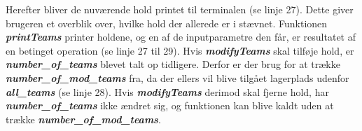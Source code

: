 Herefter bliver de nuværende hold printet til terminalen (se linje 27). Dette giver brugeren et overblik over, hvilke hold der allerede er i stævnet. Funktionen \textbf{\textit{printTeams}} printer holdene, og en af de inputparametre den får, er resultatet af en betinget operation (se linje 27 til 29). Hvis \textbf{\textit{modifyTeams}} skal tilføje hold, er \textbf{\textit{number\_of\_teams}} blevet talt op tidligere. Derfor er der brug for at trække \textbf{\textit{number\_of\_mod\_teams}} fra, da der ellers vil blive tilgået lagerplads udenfor \textbf{\textit{all\_teams}} (se linje 28). Hvis \textbf{\textit{modifyTeams}} derimod skal fjerne hold, har \textbf{\textit{number\_of\_teams}} ikke ændret sig, og funktionen kan blive kaldt uden at trække \textbf{\textit{number\_of\_mod\_teams}}.

\clearpage

